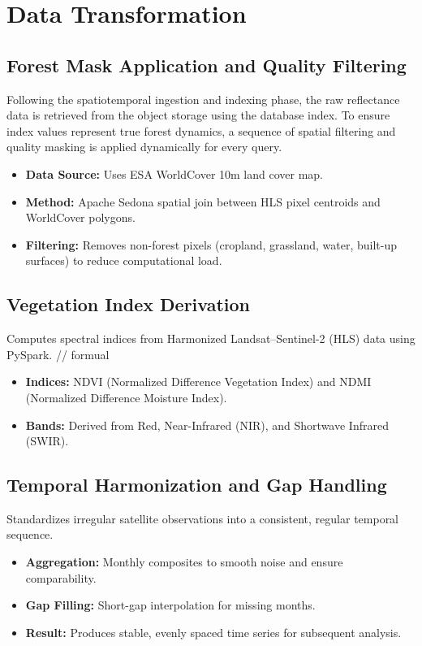 \section{Data Transformation}
\label{sec:data_transformation}

\subsection{Forest Mask Application and Quality Filtering}
Following the spatiotemporal ingestion and indexing phase, the raw reflectance data is retrieved from the object storage using the database index. To ensure index values represent true forest dynamics, a sequence of spatial filtering and quality masking is applied dynamically for every query.



\begin{itemize}
    \item \textbf{Data Source:} Uses ESA WorldCover 10m land cover map.
    \item \textbf{Method:} Apache Sedona spatial join between HLS pixel centroids and WorldCover polygons.
    \item \textbf{Filtering:} Removes non-forest pixels (cropland, grassland, water, built-up surfaces) to reduce computational load.
\end{itemize}

\subsection{Vegetation Index Derivation}
\label{subsec:vi_derivation}
Computes spectral indices from Harmonized Landsat--Sentinel-2 (HLS) data using PySpark.
// formual
\begin{itemize}
    \item \textbf{Indices:} NDVI (Normalized Difference Vegetation Index) and NDMI (Normalized Difference Moisture Index).
    \item \textbf{Bands:} Derived from Red, Near-Infrared (NIR), and Shortwave Infrared (SWIR).
\end{itemize}

\subsection{Temporal Harmonization and Gap Handling}
Standardizes irregular satellite observations into a consistent, regular temporal sequence.
\begin{itemize}
    \item \textbf{Aggregation:} Monthly composites to smooth noise and ensure comparability.
    \item \textbf{Gap Filling:} Short-gap interpolation for missing months.
    \item \textbf{Result:} Produces stable, evenly spaced time series for subsequent analysis.
\end{itemize}


